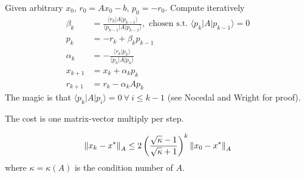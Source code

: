 \documentclass[class=article,crop=false]{standalone}
\begin{document}
\begin{thm}
Given arbitrary $ x_0$, $ r_0 = A x_0 - b$, $ p_0 = -r_0$. Compute iteratively
\begin{align*}
	\beta_k &= \frac{\langle r_k|A|p_{k-1} \rangle}{ \langle p_{k-1}|A|p_{k-1} \rangle}, \text{ chosen s.t. }  \langle p_k|A|p_{k-1} \rangle=0 \\
p_k &= -r_k + \beta_k p_{k-1}\\
\alpha_k &= - \frac{\langle r_k|p_k \rangle}{ \langle p_k|A|p_k \rangle} \\
	x_{k+1} &= x_k + \alpha_k p_k \\
	r_{k+1} &= r_k - \alpha_k A p_k
\end{align*}
The magic is that $ \langle p_k|A|p_i \rangle=0 \ \forall \ i\leq k-1$ (see Nocedal and Wright for proof). 

The cost is one matrix-vector multiply per step.
\end{thm}
\begin{thm}[convergence of CG]
\begin{align*}
	{\left\lVert{ x_k - x^* }\right\rVert}_A \leq 2 \left( \frac{\sqrt{\kappa}-1 }{\sqrt{\kappa} +1 } \right)^{k} {\left\lVert{ x_0 - x^* }\right\rVert}_A 
\end{align*}
where $ \kappa = \kappa(A)$ is the condition number of  $ A$.
\end{thm}
\end{document}
